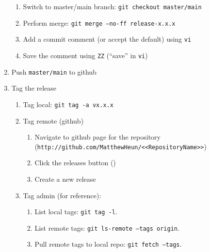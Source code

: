 \documentclass{article}
\begin{document}
\begin{enumerate}
\begin{enumerate}
    \item Switch to master/main branch: \texttt{git checkout master/main}

    \item Perform merge: \texttt{git merge --no-ff release-x.x.x}

	\item Add a commit comment (or accept the default) using \texttt{vi}

	\item Save the comment using \texttt{ZZ} (``save'' in \texttt{vi})

  \end{enumerate}
  \item Push \texttt{master/main} to github

  \item Tag the release
  \begin{enumerate}

    \item Tag local: \texttt{git tag -a vx.x.x}

    \item Tag remote (github)
	\begin{enumerate}

	  \item Navigate to github page for the repository\\
	  		(\texttt{http://github.com/MatthewHeun/<<RepositoryName>>})

	  \item Click the releases button ()

	  \item Create a new release

	\end{enumerate}
	\item Tag admin (for reference):
	\begin{enumerate}

	  \item List local tags: \texttt{git tag -l}.

	  \item List remote tags: \texttt{git ls-remote --tags origin}.

	  \item Pull remote tags to local repo: \texttt{git fetch --tags}.


\end{enumerate}
\end{enumerate}
\end{enumerate}
\end{document}
